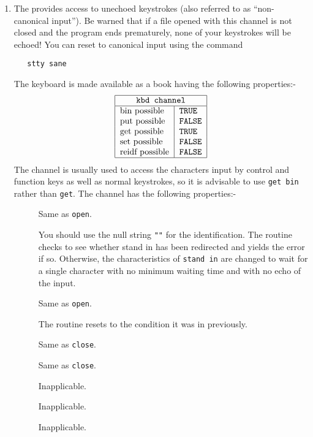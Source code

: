 \begin{enumerate}
\item {}\newline
The  provides access to unechoed keystrokes (also referred
to as ``non-canonical input''). Be warned that if a file opened with
this channel is not closed and the program ends prematurely, none of
your keystrokes will be echoed! You can reset to canonical input using
the command
\begin{verbatim}
   stty sane
\end{verbatim}
\noindent
The keyboard is made available as a book having the following
properties:-
$$\begin{tabular}{|l|l|}\hline
  \multicolumn{2}{|c|}{\texttt{kbd channel}}\\ \hline
  bin possible & \texttt{TRUE} \\
  put possible & \texttt{FALSE} \\
  get possible & \texttt{TRUE} \\
  set possible & \texttt{FALSE} \\
  reidf possible & \texttt{FALSE}\\ \hline
  \end{tabular}
$$
The channel is usually used to access the characters input by control
and function keys as well as normal keystrokes, so it is advisable to
use \verb|get bin| rather than \verb|get|. The channel has the
following properties:-
\begin{description}
\item[] Same as \verb|open|.
\item[] You should use the null string \verb|""| for the
identification. The routine checks to see whether stand in has been
redirected and yields the error  if so.
Otherwise, the characteristics of \verb|stand in| are changed to wait
for a single character with no minimum waiting time and with no echo
of the input.
\item[] Same as \verb|open|.
\item[] The routine resets  to the
condition it was in previously.
\item[] Same as \verb|close|.
\item[] Same as \verb|close|.
\item[] Inapplicable.
\item[] Inapplicable.
\item[] Inapplicable.
\end{description}


\end{enumerate}
